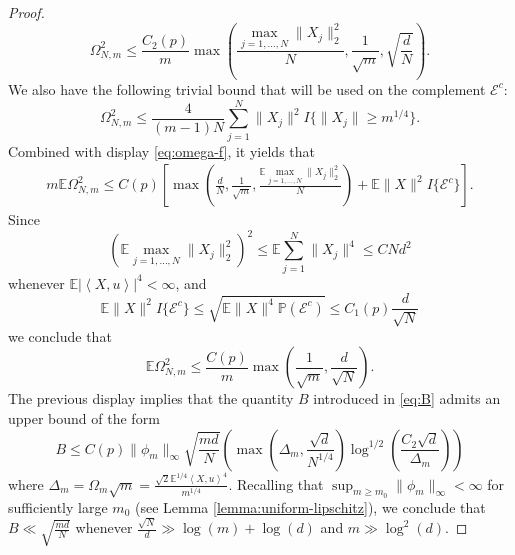 \documentclass[12pt]{article}
\def\l{\left}
\def\r{\right}
\newcommand{\m}{\mathcal}
\newcommand{\mb}{\mathbb}
\newcommand{\pr}[1]{\mathbb{P}{\left(#1\right)}}
\newcommand{\dotp}[2]{\left\langle#1,#2\right\rangle}
\theoremstyle{thmstyletwo}%
\theoremstyle{thmstylethree}%
\begin{document}
\begin{proof}
\begin{equation}
\Omega^2_{N,m}\leq \frac{C_2(p)}{m}\max\l(\frac{\max_{j=1,\ldots,N} \|X_j\|_2^2}{N}, \frac{1}{\sqrt m} ,\sqrt{\frac{d}{N}}\r).
\end{equation}
We also have the following trivial bound that will be used on the complement $\m E^c$: 
\[
\Omega^2_{N,m}\leq \frac{4}{(m-1)N}\sum_{j=1}^N \|X_j\|^2 I\{\|X_j\|\geq m^{1/4}\}.
\]
Combined with display \eqref{eq:omega-f}, it yields that 
\begin{multline*}
   m \mb E\Omega^2_{N,m} \leq C(p)\l[\max\l( \frac{d}{N},\frac{1}{\sqrt m},\frac{\mb E \max_{j=1,\ldots,N} \|X_j\|_2^2}{N}\r) + 
    \mb E\|X\|^2 I\{\m E^c\}\r].
\end{multline*}
Since 
\[
\l(\mb E \max_{j=1,\ldots,N} \|X_j\|_2^2\r)^2 \leq \mb E\sum_{j=1}^N \|X_j\|^4 \leq C N d^2 
\]
whenever $\mb E \l| \dotp{X}{u}\r|^4<\infty$, and
\[
\mb E\|X\|^2 I\{\m E^c\}\leq \sqrt{\mb E\|X\|^4\pr{\m E^c}} \leq C_1(p)\frac{d}{\sqrt N}
\]
we conclude that 
\begin{equation}
    \label{eq:omega-final}
\mb E \Omega^2_{N,m}\leq \frac{C(p)}{m}\max\l( \frac{1}{\sqrt m},\frac{d}{\sqrt N}\r).
\end{equation}
The previous display implies that the quantity $B$ introduced in \eqref{eq:B} admits an upper bound of the form
\begin{equation*}
    B \leq C(p)\|\phi_m\|_\infty\sqrt{\frac{md}{N}} \l( \max\l(\Delta_m,\frac{\sqrt{d}}{N^{1/4}}\r)
\log^{1/2}\l( \frac{C_2\sqrt{d}}{\Delta_m}\r) 
 \r) 
\end{equation*}
where $\Delta_m = \Omega_m\sqrt{m} = \frac{\sqrt{2}\mb E^{1/4}\dotp{X}{u}^4}{m^{1/4}}$. Recalling that $\sup_{m\geq m_0}\|\phi_m\|_\infty<\infty$ for sufficiently large $m_0$ (see Lemma \ref{lemma:uniform-lipschitz}), we conclude that $B\ll \sqrt{\frac{md}{N}}$ whenever $\frac{\sqrt N}{d}\gg \log(m)+\log(d)$ and $m\gg \log^2(d)$. 


\end{proof}
\end{document}
